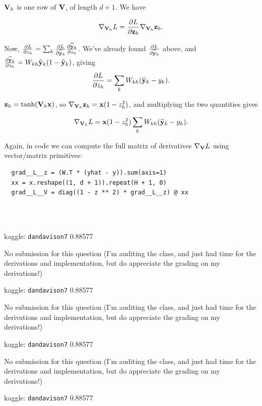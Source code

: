 \begin{mdframed}
$\mathbf V_h$ is one row of $\mathbf V$, of length $d + 1$. We have

\begin{align*}
  \nabla_{\mathbf V_h} L = \frac{\partial L}{\partial \mathbf z_h}\nabla_{\mathbf V_h} \mathbf z_h.
\end{align*}

Now,
$\frac{\partial L}{\partial z_h} = \sum_k \frac{\partial L}{\partial \mathbf{\widehat{y}}_k} \frac{\partial \mathbf{\widehat{y}}_k}{\partial z_h}$.
We've already found $\frac{\partial L}{\partial \mathbf{\widehat{y}}_k}$ above, and
$\frac{\partial \mathbf{\widehat{y}}_k}{\partial z_h} = W_{kh}\mathbf{\widehat{y}}_k(1 - \mathbf{\widehat{y}}_k)$, giving
\begin{align*}
  \frac{\partial L}{\partial z_h} = \sum_k W_{kh} (\mathbf{\widehat{y}}_k - y_k).
\end{align*}

$\mathbf z_h = \tanh(\mathbf V_h \mathbf x)$, so $\nabla_{\mathbf V_h} \mathbf z_h = \mathbf x(1 - z_h^2)$, and
multiplying the two quantities gives

\begin{align*}
  \nabla_{\mathbf V_h} L =  \mathbf x(1 - z_h^2) \sum_k W_{kh} (\mathbf{\widehat{y}}_k - y_k).
\end{align*}


Again, in code we can compute the full matrix of derivatives $\nabla_{\mathbf V} L$
using vector/matrix primitives:

\begin{verbatim}
  grad__L__z = (W.T * (yhat - y)).sum(axis=1)
  xx = x.reshape((1, d + 1)).repeat(H + 1, 0)
  grad__L__V = diag((1 - z ** 2) * grad__L__z) @ xx
\end{verbatim}

\end{mdframed}
~\\~\\
\begin{mdframed}
  kaggle: \texttt{dandavison7} 0.88577
\end{mdframed}

\newpage
No submission for this question (I'm auditing the class, and just had time for
the derivations and implementation, but do appreciate the grading on my
derivations!)
\begin{mdframed}
  kaggle: \texttt{dandavison7} 0.88577
\end{mdframed}

\newpage
No submission for this question (I'm auditing the class, and just had time for
the derivations and implementation, but do appreciate the grading on my
derivations!)
\begin{mdframed}
  kaggle: \texttt{dandavison7} 0.88577
\end{mdframed}

\newpage
No submission for this question (I'm auditing the class, and just had time for
the derivations and implementation, but do appreciate the grading on my
derivations!)
\begin{mdframed}
  kaggle: \texttt{dandavison7} 0.88577
\end{mdframed}

